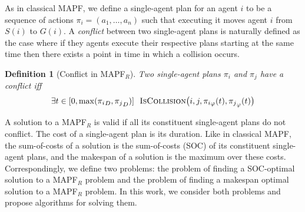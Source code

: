 \documentclass[review]{elsarticle}
\newtheorem{definition}{Definition}
\newcommand{\target}{\ensuremath{G}\xspace}
\newcommand{\source}{\ensuremath{S}\xspace}
\newcommand\konstantin[1]{\nb{\textbf{Konstantin:}}{red}{#1}}
\newcommand\roni[1]{\nb{\textbf{Roni:}}{green}{#1}}
\newcommand{\mapfr}{\ac{MAPF}$_R$\xspace}
\newcommand{\mapf}{\ac{MAPF}\xspace}
\newcommand{\iscollision}{\textsc{IsCollision}\xspace}
\begin{document}



As in classical \mapf, we define a single-agent plan for an agent $i$ to be a sequence of actions $\pi_i=(a_1,\ldots, a_n)$ 
such that executing it moves agent $i$ from $\source(i)$ to $\target(i)$. 
A \emph{conflict} between two single-agent plans is naturally defined as the case where if they agents execute their respective plans starting at the same time then there exists a point in time in which a collision occurs. 

\begin{definition}[Conflict in \mapfr]
Two single-agent plans $\pi_i$ and $\pi_j$ have a conflict iff 
\begin{equation}
    \exists t\in [0, \max({\pi_i}_D,{\pi_j}_D)] 
        ~~ \iscollision\big(i,j,{\pi_i}_\varphi(t), {\pi_j}_\varphi(t)\big)
\end{equation}
\label{def:conflict-mapfr}
\end{definition}





A solution to a \mapfr is valid if all its constituent single-agent plans do not conflict. The cost of a single-agent plan is its duration. Like in classical \mapf, the sum-of-costs of a solution is the sum-of-costs (SOC) of its constituent single-agent plans, and the makespan of a solution is the maximum over these costs. 
Correspondingly, we define two problems: 
the problem of finding a SOC-optimal solution to a \mapfr problem and the problem of finding a makespan optimal solution to a \mapfr problem. In this work, we 
consider both problems and propose algorithms for solving them. 
\end{document}
